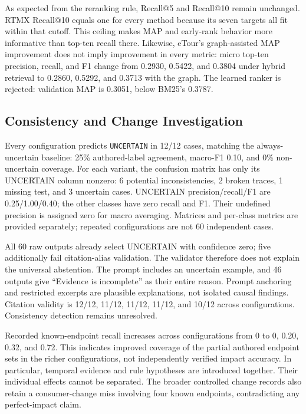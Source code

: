\documentclass[conference,letterpaper,10pt]{IEEEtran}
\begin{document}
As expected from the reranking rule, Recall@5 and Recall@10 remain unchanged. RTMX Recall@10 equals one for every method because its seven targets all fit within that cutoff. This ceiling makes MAP and early-rank behavior more informative than top-ten recall there. Likewise, eTour's graph-assisted MAP improvement does not imply improvement in every metric: micro top-ten precision, recall, and F1 change from 0.2930, 0.5422, and 0.3804 under hybrid retrieval to 0.2860, 0.5292, and 0.3713 with the graph. The learned ranker is rejected: validation MAP is 0.3051, below BM25's 0.3787.

\subsection{Consistency and Change Investigation}
Every configuration predicts \texttt{UNCERTAIN} in 12/12 cases, matching the always-uncertain baseline: 25\% authored-label agreement, macro-F1 0.10, and 0\% non-uncertain coverage. For each variant, the confusion matrix has only its UNCERTAIN column nonzero: 6 potential inconsistencies, 2 broken traces, 1 missing test, and 3 uncertain cases. UNCERTAIN precision/recall/F1 are 0.25/1.00/0.40; the other classes have zero recall and F1. Their undefined precision is assigned zero for macro averaging. Matrices and per-class metrics are provided separately; repeated configurations are not 60 independent cases.

All 60 raw outputs already select UNCERTAIN with confidence zero; five additionally fail citation-alias validation. The validator therefore does not explain the universal abstention. The prompt includes an uncertain example, and 46 outputs give ``Evidence is incomplete'' as their entire reason. Prompt anchoring and restricted excerpts are plausible explanations, not isolated causal findings. Citation validity is 12/12, 11/12, 11/12, 11/12, and 10/12 across configurations. Consistency detection remains unresolved.

Recorded known-endpoint recall increases across configurations from 0 to 0, 0.20, 0.32, and 0.72. This indicates improved coverage of the partial authored endpoint sets in the richer configurations, not independently verified impact accuracy. In particular, temporal evidence and rule hypotheses are introduced together. Their individual effects cannot be separated. The broader controlled change records also retain a consumer-change miss involving four known endpoints, contradicting any perfect-impact claim.
\end{document}
